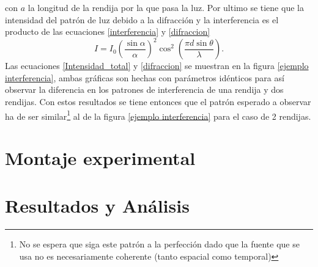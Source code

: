 \documentclass[%
 reprint,
 amsmath,amssymb,
 aps,
]{revtex4-1}
\begin{document}
con $a$ la longitud de la rendija por la que pasa la luz. Por ultimo se tiene que la intensidad del patrón de luz debido a la difracción y la interferencia es el producto de las ecuaciones \eqref{interferencia} y \eqref{difraccion}
\begin{equation}
I=I_0\left(\frac{\sin\alpha}{\alpha}\right)^2\cos^2\left(\frac{\pi d \sin\theta}{\lambda}\right).
\label{Intensidad_total}
\end{equation}
Las ecuaciones \eqref{Intensidad_total} y \eqref{difraccion} se muestran en la figura \ref{ejemplo interferencia}, ambas gráficas son hechas con parámetros idénticos para así observar la diferencia en los patrones de interferencia de una rendija y dos rendijas. Con estos resultados se tiene entonces que el patrón esperado a observar ha de ser similar\footnote{No se espera que siga este patrón a la perfección dado que la fuente que se usa no es necesariamente coherente (tanto espacial como temporal)} al de la figura \ref{ejemplo interferencia} para el caso de 2 rendijas. 
\section{Montaje experimental}
\section{Resultados y Análisis}
\end{document}
